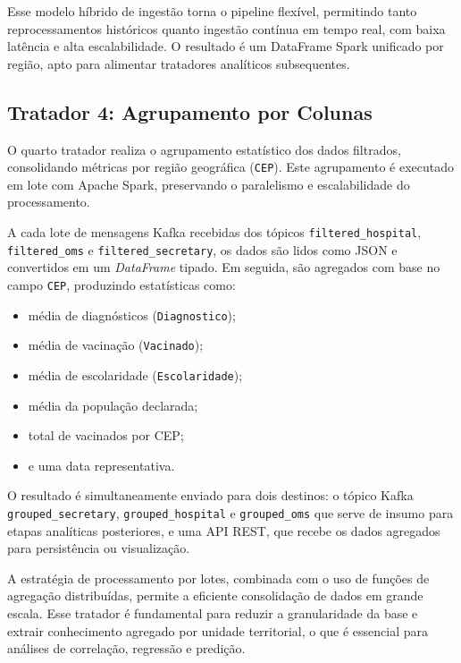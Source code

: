 \documentclass[a4paper,12pt]{article}
\begin{document}
Esse modelo híbrido de ingestão torna o pipeline flexível, permitindo tanto reprocessamentos históricos quanto ingestão contínua em tempo real, com baixa latência e alta escalabilidade. O resultado é um DataFrame Spark unificado por região, apto para alimentar tratadores analíticos subsequentes.



\subsection{Tratador 4: Agrupamento por Colunas}

O quarto tratador realiza o agrupamento estatístico dos dados filtrados, consolidando métricas por região geográfica (\texttt{CEP}). Este agrupamento é executado em lote com Apache Spark, preservando o paralelismo e escalabilidade do processamento.

A cada lote de mensagens Kafka recebidas dos tópicos \texttt{filtered\_hospital},  \texttt{filtered\_oms} e  \texttt{filtered\_secretary}, os dados são lidos como JSON e convertidos em um \textit{DataFrame} tipado. Em seguida, são agregados com base no campo \texttt{CEP}, produzindo estatísticas como:
\begin{itemize}
    \item média de diagnósticos (\texttt{Diagnostico});
    \item média de vacinação (\texttt{Vacinado});
    \item média de escolaridade (\texttt{Escolaridade});
    \item média da população declarada;
    \item total de vacinados por CEP;
    \item e uma data representativa.
\end{itemize}

O resultado é simultaneamente enviado para dois destinos: o tópico Kafka \texttt{grouped\_secretary}, \texttt{grouped\_hospital} e \texttt{grouped\_oms} que serve de insumo para etapas analíticas posteriores, e uma API REST, que recebe os dados agregados para persistência ou visualização.

A estratégia de processamento por lotes, combinada com o uso de funções de agregação distribuídas, permite a eficiente consolidação de dados em grande escala. Esse tratador é fundamental para reduzir a granularidade da base e extrair conhecimento agregado por unidade territorial, o que é essencial para análises de correlação, regressão e predição.
\end{document}
